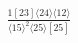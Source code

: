 \documentclass[varwidth, border=5pt]{standalone}
\begin{document}
\begin{my}
$\begin{gathered}
\scriptscriptstyle\frac{1[23]⟨24⟩⟨12⟩}{⟨15⟩^2⟨25⟩[25]}
\end{gathered}$
\end{my}
\end{document}
